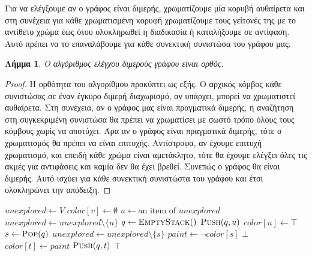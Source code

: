 \documentclass[11pt,a4paper,oneside]{report}
\newtheorem*{lemma}{Λήμμα}
\begin{document}
Για να ελέγξουμε αν ο γράφος είναι διμερής, χρωματίζουμε μία κορυβή αυθαίρετα και στη συνέχεια για κάθε χρωματισμένη κορυφή χρωματίζουμε τους γείτονές της με το αντίθετο χρώμα έως ότου ολοκληρωθεί η διαδικασία ή καταλήξουμε σε αντίφαση. 
Αυτό πρέπει να το επαναλάβουμε για κάθε συνεκτική συνιστώσα του γράφου μας.

\begin{lemma}
Ο αλγόριθμος ελέγχου διμερούς γράφου είναι ορθός.
\end{lemma}
\begin{proof}
Η ορθότητα του αλγορίθμου προκύπτει ως εξής. Ο αρχικός κόμβος κάθε συνιστώσας σε έναν έγκυρο διμερή διαχωρισμό, αν υπάρχει, μπορεί να χρωματιστεί αυθαίρετα. Στη συνέχεια, αν ο γράφος μας είναι πραγματικά διμερής, η αναζήτηση στη συγκεκριμένη συνιστώσα θα πρέπει να χρωματίσει με σωστό τρόπο όλους τους κόμβους χωρίς να αποτύχει. Άρα αν ο γράφος είναι πραγματικά διμερής, τότε ο χρωματισμός θα πρέπει να είναι επιτυχής. Αντίστροφα, αν έχουμε επιτυχή χρωματισμό, και επειδή κάθε χρώμα είναι αμετάκλητο, τότε θα έχουμε ελέγξει όλες τις ακμές για αντιφάσεις και καμία δεν θα έχει βρεθεί. Συνεπώς ο γράφος θα είναι διμερής. Αυτό ισχύει για κάθε συνεκτική συνιστώστα του γράφου και έτσι ολοκληρώνει την απόδειξη.
\end{proof}

\begin{algorithm}[H]
\caption{\textgreek{Άσκηση 1}}
\begin{algorithmic}[1]

    \State $unexplored \gets V$
        \State $color[ v ] \gets \emptyset$
    \EndFor
    	\State $u \gets \text{an item of } unexplored$
        \State $unexplored \gets unexplored \setminus \{u\}$
        \State $q \gets \Call{EmptyStack}$
        \State $\Call{Push}{q, u}$
        \State $color[ u ] \gets \top$
            \State $s \gets \Call{Pop}{q}$
            \State $unexplored \gets unexplored \setminus \{s\}$
            \State $paint \gets \lnot color[ s ]$
                        \State \Return $\bot$
                    \EndIf
                \Else
                    \State $color[ t ] \gets paint$
                    \State $\Call{Push}{q, t}$
                \EndIf
            \EndFor
        \EndWhile
    \EndWhile
    \State \Return $\top$
\EndProcedure
\end{algorithmic}
\end{algorithm}
\end{document}
